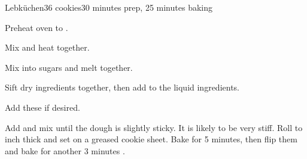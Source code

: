 \documentclass[../Cookbook.tex]{subfiles}
\begin{document}
\begin{recipe}{Lebk\"uchen}{36 cookies}{30 minutes prep, 25 minutes baking}

	Preheat oven to .

	Mix and heat together.

	Mix into sugars and melt together.

	Sift dry ingredients together, then add to the liquid ingredients.

	Add these if desired.

	Add and mix until the dough is slightly sticky. It is likely to be very stiff. Roll to  inch thick and set on a greased cookie sheet. Bake for
	5 minutes, then flip them and bake for another 3 minutes%
	.

\end{recipe}
\end{document}
